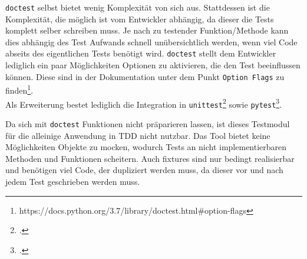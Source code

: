 \lstinline{doctest} selbst bietet wenig Komplexität von sich aus. Stattdessen
ist die Komplexität, die möglich ist vom Entwickler abhängig, da
dieser die Tests komplett selber schreiben muss. Je nach zu testender
Funktion/Methode kann dies abhängig des Test Aufwands schnell unübersichtlich
werden, wenn viel Code abseits des eigentlichen Tests benötigt wird.
\lstinline{doctest} stellt dem Entwickler lediglich ein paar Möglichkeiten
Optionen zu aktivieren, die den Test beeinflussen können. Diese sind in der
Dokumentation unter dem Punkt \lstinline{Option Flags} zu
finden\footnote{https://docs.python.org/3.7/library/doctest.html\#option-flags}.
\\
Als Erweiterung bestet lediglich die Integration in
\lstinline{unittest}\footcite{docs.python:doctest} sowie
\lstinline{pytest}\footcite{docs.pytest.org:4.4}.
\newline

Da sich mit \lstinline{doctest} Funktionen nicht präparieren lassen, ist dieses
Testmodul für die alleinige Anwendung in TDD nicht nutzbar. Das Tool bietet
keine Möglichkeiten Objekte zu \gls{mock}en, wodurch Tests an nicht
implementierbaren Methoden und Funktionen scheitern. Auch \Glspl{fixture} sind
nur bedingt realisierbar und benötigen viel Code, der dupliziert werden muss, da
dieser vor und nach jedem Test geschrieben werden muss.